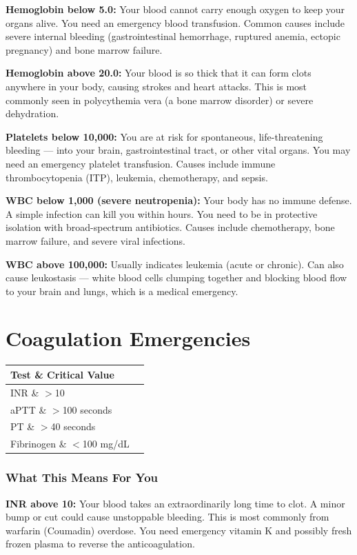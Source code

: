 \textbf{Hemoglobin below 5.0:} Your blood cannot carry enough oxygen to keep your organs alive. You need an emergency blood transfusion. Common causes include severe internal bleeding (gastrointestinal hemorrhage, ruptured anemia, ectopic pregnancy) and bone marrow failure.

\textbf{Hemoglobin above 20.0:} Your blood is so thick that it can form clots anywhere in your body, causing strokes and heart attacks. This is most commonly seen in polycythemia vera (a bone marrow disorder) or severe dehydration.

\textbf{Platelets below 10,000:} You are at risk for spontaneous, life-threatening bleeding --- into your brain, gastrointestinal tract, or other vital organs. You may need an emergency platelet transfusion. Causes include immune thrombocytopenia (ITP), leukemia, chemotherapy, and sepsis.

\textbf{WBC below 1,000 (severe neutropenia):} Your body has no immune defense. A simple infection can kill you within hours. You need to be in protective isolation with broad-spectrum antibiotics. Causes include chemotherapy, bone marrow failure, and severe viral infections.

\textbf{WBC above 100,000:} Usually indicates leukemia (acute or chronic). Can also cause leukostasis --- white blood cells clumping together and blocking blood flow to your brain and lungs, which is a medical emergency.

\clearpage
\section{Coagulation Emergencies}

\begin{longtable}{@{}ll@{}}
\toprule
\textbf{Test} \& \textbf{Critical Value} \\
\midrule
INR \& $>$10 \\
aPTT \& $>$100 seconds \\
PT \& $>$40 seconds \\
Fibrinogen \& $<$100 mg/dL \\
\bottomrule
\end{longtable}

\subsubsection{What This Means For You}

\textbf{INR above 10:} Your blood takes an extraordinarily long time to clot. A minor bump or cut could cause unstoppable bleeding. This is most commonly from warfarin (Coumadin) overdose. You need emergency vitamin K and possibly fresh frozen plasma to reverse the anticoagulation.

